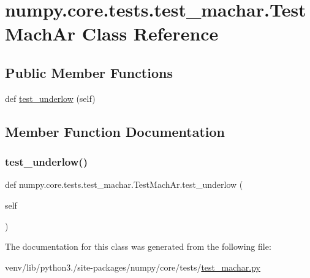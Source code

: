 \hypertarget{classnumpy_1_1core_1_1tests_1_1test__machar_1_1TestMachAr}{}\section{numpy.\+core.\+tests.\+test\+\_\+machar.\+Test\+Mach\+Ar Class Reference}
\label{classnumpy_1_1core_1_1tests_1_1test__machar_1_1TestMachAr}
\subsection*{Public Member Functions}
\begin{DoxyCompactItemize}
\item 
def \hyperlink{classnumpy_1_1core_1_1tests_1_1test__machar_1_1TestMachAr_a2a86a6749e25394aee1d462887bad144}{test\+\_\+underlow} (self)
\end{DoxyCompactItemize}


\subsection{Member Function Documentation}
\mbox{\label{classnumpy_1_1core_1_1tests_1_1test__machar_1_1TestMachAr_a2a86a6749e25394aee1d462887bad144}} 
\subsubsection{\texorpdfstring{test\+\_\+underlow()}{test\_underlow()}}
{\footnotesize\ttfamily def numpy.\+core.\+tests.\+test\+\_\+machar.\+Test\+Mach\+Ar.\+test\+\_\+underlow (\begin{DoxyParamCaption}\item[{}]{self }\end{DoxyParamCaption})}



The documentation for this class was generated from the following file\+:\begin{DoxyCompactItemize}
\item 
venv/lib/python3./site-\/packages/numpy/core/tests/\hyperlink{test__machar_8py}{test\+\_\+machar.\+py}\end{DoxyCompactItemize}
